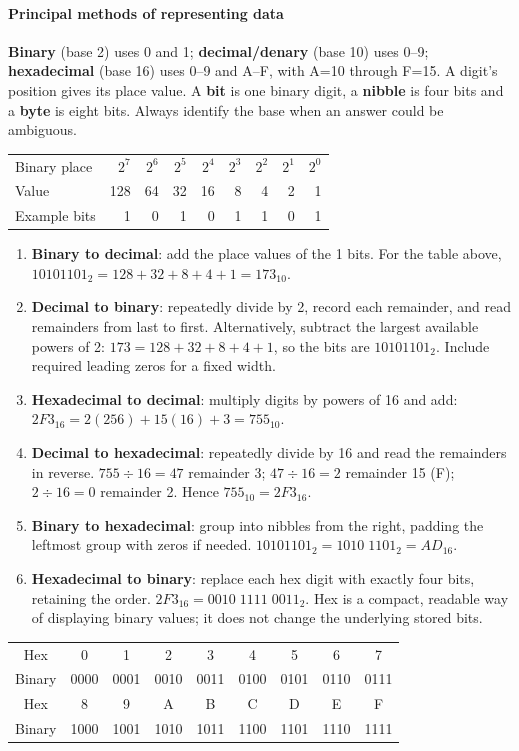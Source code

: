 \documentclass[a4paper,12pt]{article}
\begin{document}
\paragraph{Principal methods of representing data}
\textbf{Binary} (base 2) uses 0 and 1; \textbf{decimal/denary} (base 10) uses 0--9; \textbf{hexadecimal} (base 16) uses 0--9 and A--F, with A=10 through F=15. A digit's position gives its place value. A \textbf{bit} is one binary digit, a \textbf{nibble} is four bits and a \textbf{byte} is eight bits. Always identify the base when an answer could be ambiguous.
\begin{center}
\begin{tabular}{l r r r r r r r r}
\toprule
Binary place & $2^7$ & $2^6$ & $2^5$ & $2^4$ & $2^3$ & $2^2$ & $2^1$ & $2^0$ \\
Value & 128 & 64 & 32 & 16 & 8 & 4 & 2 & 1 \\
Example bits & 1 & 0 & 1 & 0 & 1 & 1 & 0 & 1 \\
\bottomrule
\end{tabular}
\end{center}
\begin{enumerate}
    \item \textbf{Binary to decimal}: add the place values of the 1 bits. For the table above, $10101101_2=128+32+8+4+1=173_{10}$.
    \item \textbf{Decimal to binary}: repeatedly divide by 2, record each remainder, and read remainders from last to first. Alternatively, subtract the largest available powers of 2: $173=128+32+8+4+1$, so the bits are $10101101_2$. Include required leading zeros for a fixed width.
    \item \textbf{Hexadecimal to decimal}: multiply digits by powers of 16 and add: $2F3_{16}=2(256)+15(16)+3=755_{10}$.
    \item \textbf{Decimal to hexadecimal}: repeatedly divide by 16 and read the remainders in reverse. $755\div16=47$ remainder 3; $47\div16=2$ remainder 15 (F); $2\div16=0$ remainder 2. Hence $755_{10}=2F3_{16}$.
    \item \textbf{Binary to hexadecimal}: group into nibbles from the right, padding the leftmost group with zeros if needed. $10101101_2=1010\;1101_2=AD_{16}$.
    \item \textbf{Hexadecimal to binary}: replace each hex digit with exactly four bits, retaining the order. $2F3_{16}=0010\;1111\;0011_2$. Hex is a compact, readable way of displaying binary values; it does not change the underlying stored bits.
\end{enumerate}
\begin{center}
\small
\begin{tabular}{c|*{8}{c}}
Hex & 0 & 1 & 2 & 3 & 4 & 5 & 6 & 7 \\
Binary & 0000 & 0001 & 0010 & 0011 & 0100 & 0101 & 0110 & 0111 \\
\midrule
Hex & 8 & 9 & A & B & C & D & E & F \\
Binary & 1000 & 1001 & 1010 & 1011 & 1100 & 1101 & 1110 & 1111 \\
\end{tabular}
\end{center}
\end{document}

